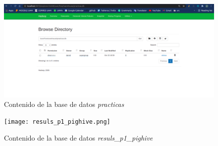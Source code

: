 \begin{figure}[hp!]
	\includegraphics[scale=0.25]{figures/hadoop_practicas.png}
	\caption{Contenido de la base de datos \textit{practicas}}
	\label{fig:practicas}
\end{figure}
\pagebreak
\begin{figure}[hp!]
	\texttt{[image: resuls\_p1\_pighive.png]}
	\caption{Contenido de la base de datos \textit{resuls\_p1\_pighive}}
	\label{fig:resuls_hive}
\end{figure}
